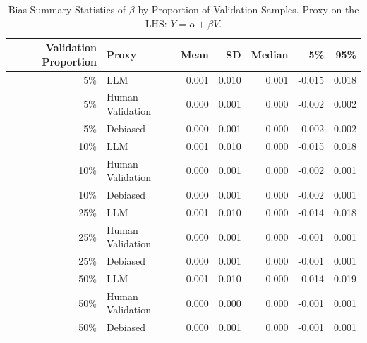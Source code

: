 \begin{table}

\caption{\label{tab:unnamed-chunk-2}Bias Summary Statistics of $\beta$ by Proportion of Validation Samples. Proxy on the LHS: $Y = \alpha + \beta V$.}
\centering
\begin{tabular}[t]{rlrrrrr}
\toprule
Validation Proportion & Proxy & Mean & SD & Median & 5\% & 95\%\\
\midrule
5\% & LLM & 0.001 & 0.010 & 0.001 & -0.015 & 0.018\\
5\% & Human Validation & 0.000 & 0.001 & 0.000 & -0.002 & 0.002\\
5\% & Debiased & 0.000 & 0.001 & 0.000 & -0.002 & 0.002\\
10\% & LLM & 0.001 & 0.010 & 0.000 & -0.015 & 0.018\\
10\% & Human Validation & 0.000 & 0.001 & 0.000 & -0.002 & 0.001\\
10\% & Debiased & 0.000 & 0.001 & 0.000 & -0.002 & 0.001\\
25\% & LLM & 0.001 & 0.010 & 0.000 & -0.014 & 0.018\\
25\% & Human Validation & 0.000 & 0.001 & 0.000 & -0.001 & 0.001\\
25\% & Debiased & 0.000 & 0.001 & 0.000 & -0.001 & 0.001\\
50\% & LLM & 0.001 & 0.010 & 0.000 & -0.014 & 0.019\\
50\% & Human Validation & 0.000 & 0.000 & 0.000 & -0.001 & 0.001\\
50\% & Debiased & 0.000 & 0.001 & 0.000 & -0.001 & 0.001\\
\bottomrule
\end{tabular}
\end{table}
